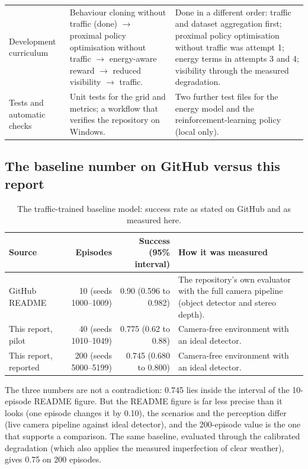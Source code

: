 \begin{table}[H]
\begin{tabularx}{\textwidth}{@{}>{\raggedright\arraybackslash}p{2.9cm}>{\raggedright\arraybackslash}p{3.9cm}>{\raggedright\arraybackslash}X@{}}
Development curriculum & Behaviour cloning without traffic (done) $\to$ proximal policy optimisation without traffic $\to$ energy-aware reward $\to$ reduced visibility $\to$ traffic. & Done in a different order: traffic and dataset aggregation first; proximal policy optimisation without traffic was attempt 1; energy terms in attempts 3 and 4; visibility through the measured degradation.\\
Tests and automatic checks & Unit tests for the grid and metrics; a workflow that verifies the repository on Windows. & Two further test files for the energy model and the reinforcement-learning policy (local only).\\\bottomrule
\end{tabularx}
\end{table}

\subsection{The baseline number on GitHub versus this report}
\begin{table}[H]\centering\small
\caption{The traffic-trained baseline model: success rate as stated on GitHub and as measured here.}\label{tab:githubbaseline}
\begin{tabularx}{\textwidth}{@{}>{\raggedright\arraybackslash}p{4.2cm}rrX@{}}\toprule
Source & Episodes & Success (95\% interval) & How it was measured\\\midrule
GitHub README & 10 (seeds 1000--1009) & 0.90 (0.596 to 0.982) & The repository's own evaluator with the full camera pipeline (object detector and stereo depth).\\
This report, pilot & 40 (seeds 1010--1049) & 0.775 (0.62 to 0.88) & Camera-free environment with an ideal detector.\\
This report, reported & 200 (seeds 5000--5199) & 0.745 (0.680 to 0.800) & Camera-free environment with an ideal detector.\\\bottomrule
\end{tabularx}
\end{table}
The three numbers are not a contradiction: 0.745 lies inside the interval of the 10-episode README figure. But the README figure is far less precise than it looks (one episode changes it by 0.10), the scenarios and the perception differ (live camera pipeline against ideal detector), and the 200-episode value is the one that supports a comparison. The same baseline, evaluated through the calibrated degradation (which also applies the measured imperfection of clear weather), gives 0.75 on 200 episodes.

